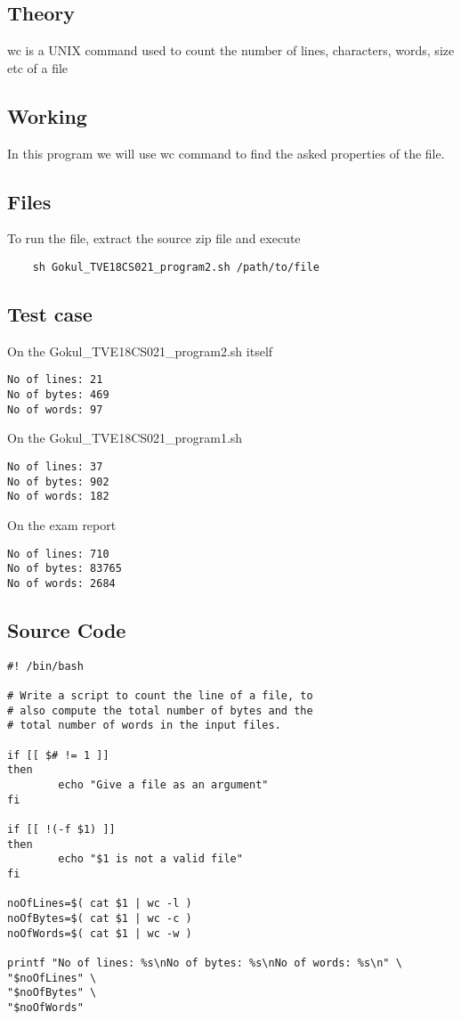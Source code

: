 \documentclass{article}
\begin{document}
\subsection{Theory}
wc is a UNIX command used to count the number of lines, characters, words, size etc of a file

\subsection{Working}
In this program we will use wc command to find the asked properties of the file.

\subsection{Files}
To run the file, extract the source zip file
and execute
\begin{verbatim}
    sh Gokul_TVE18CS021_program2.sh /path/to/file
\end{verbatim}

\subsection{Test case}
On the Gokul\_TVE18CS021\_program2.sh itself
\begin{verbatim}
No of lines: 21
No of bytes: 469
No of words: 97
\end{verbatim}

On the Gokul\_TVE18CS021\_program1.sh
\begin{verbatim}
No of lines: 37
No of bytes: 902
No of words: 182
\end{verbatim}

On the exam report
\begin{verbatim}
No of lines: 710
No of bytes: 83765
No of words: 2684
\end{verbatim}

\subsection{Source Code}
\begin{verbatim}
#! /bin/bash

# Write a script to count the line of a file, to 
# also compute the total number of bytes and the 
# total number of words in the input files.

if [[ $# != 1 ]]
then
        echo "Give a file as an argument"
fi

if [[ !(-f $1) ]]
then
        echo "$1 is not a valid file"
fi

noOfLines=$( cat $1 | wc -l )
noOfBytes=$( cat $1 | wc -c )
noOfWords=$( cat $1 | wc -w )

printf "No of lines: %s\nNo of bytes: %s\nNo of words: %s\n" \
"$noOfLines" \
"$noOfBytes" \
"$noOfWords"

\end{verbatim}
\end{document}

